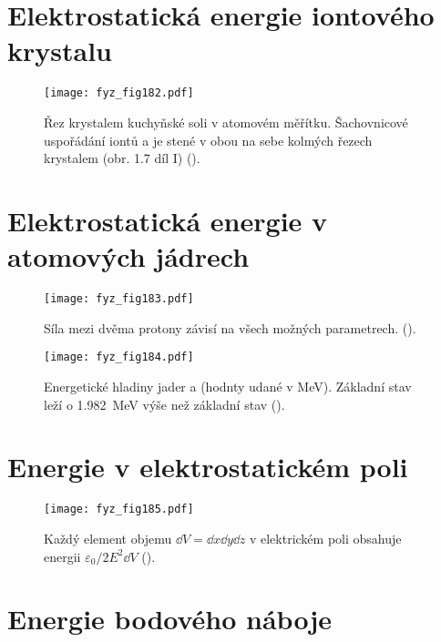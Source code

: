\section{Elektrostatická energie iontového krystalu}\label{fyz:IIchapVIsecIII}

  \begin{figure}[ht!]  %
    \centering
    \texttt{[image: fyz\_fig182.pdf]}
    \caption{Řez krystalem kuchyňské soli v atomovém měřítku. Šachovnicové uspořádání iontů  
             a  je stené v obou na sebe kolmých řezech krystalem (obr. 1.7 díl I)
             (\cite[s.~146]{Feynman02}).}
    \label{fyz:fig182}
  \end{figure}

\section{Elektrostatická energie v atomových jádrech}\label{fyz:IIchapVIsecIV}

  \begin{figure}[ht!]  %
    \centering
    \texttt{[image: fyz\_fig183.pdf]}
    \caption{Síla mezi dvěma protony závisí na všech možných parametrech. 
             (\cite[s.~148]{Feynman02}).}
    \label{fyz:fig183}
  \end{figure}

  \begin{figure}[ht!]  %
    \centering
    \texttt{[image: fyz\_fig184.pdf]}
    \caption{Energetické hladiny jader  a  (hodnty udané v 
             \si{\mega\electronvolt}). Základní stav  leží o 
             \SI{1.982}{\mega\electronvolt} výše než základní stav 
             (\cite[s.~149]{Feynman02}).}
    \label{fyz:fig184}
  \end{figure}
  
\section{Energie v elektrostatickém poli}\label{fyz:IIchapVIsecV}

  \begin{figure}[ht!]  %
    \centering
    \texttt{[image: fyz\_fig185.pdf]}
    \caption{Každý element objemu \(\dd{V} = \dd{x}\dd{y}\dd{z}\) v elektrickém  poli obsahuje 
    energii \(\varepsilon_0/2E^2\dd{V}\) 
             (\cite[s.~154]{Feynman02}).}
    \label{fyz:fig185}
  \end{figure}
  
\section{Energie bodového náboje}\label{fyz:IIchapVIsecVI}

\printbibliography[title={Seznam literatury}, heading=subbibliography]
